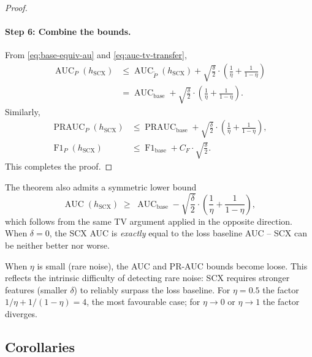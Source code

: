 \begin{proof}
\paragraph{Step 6: Combine the bounds.}
From \eqref{eq:base-equiv-au} and \eqref{eq:auc-tv-transfer},
\begin{align*}
\operatorname{AUC}_P(h_{\text{SCX}})
&\leq \operatorname{AUC}_{\tilde{P}}(h_{\text{SCX}})
   + \sqrt{\frac{\delta}{2}}\cdot\left(\frac{1}{\eta} + \frac{1}{1-\eta}\right) \\
&= \operatorname{AUC}_{\text{base}}
   + \sqrt{\frac{\delta}{2}}\cdot\left(\frac{1}{\eta} + \frac{1}{1-\eta}\right).
\end{align*}
Similarly,
\begin{align*}
\operatorname{PRAUC}_P(h_{\text{SCX}})
&\leq \operatorname{PRAUC}_{\text{base}}
   + \sqrt{\frac{\delta}{2}}\cdot\left(\frac{1}{\eta} + \frac{1}{1-\eta}\right), \\
\operatorname{F1}_P(h_{\text{SCX}})
&\leq \operatorname{F1}_{\text{base}} + C_F \cdot \sqrt{\frac{\delta}{2}}.
\end{align*}
This completes the proof.
\end{proof}

\begin{remark}
\label{remark:symmetric-bound}
The theorem also admits a symmetric lower bound
\[
\operatorname{AUC}(h_{\text{SCX}}) \;\geq\;
\operatorname{AUC}_{\text{base}} -
\sqrt{\frac{\delta}{2}}\cdot\left(\frac{1}{\eta} + \frac{1}{1-\eta}\right),
\]
which follows from the same TV argument applied in the opposite direction.
When $\delta = 0$, the SCX AUC is \emph{exactly} equal to the loss baseline
AUC -- SCX can be neither better nor worse.
\end{remark}

\begin{remark}
\label{remark:eta-interpretation}
When $\eta$ is small (rare noise), the AUC and PR-AUC bounds become loose.
This reflects the intrinsic difficulty of detecting rare noise: SCX requires
stronger features (smaller $\delta$) to reliably surpass the loss baseline.
For $\eta = 0.5$ the factor $1/\eta + 1/(1-\eta) = 4$, the most favourable
case; for $\eta \to 0$ or $\eta \to 1$ the factor diverges.
\end{remark}

\subsection{Corollaries}
\label{sec:thm2:corollaries}

